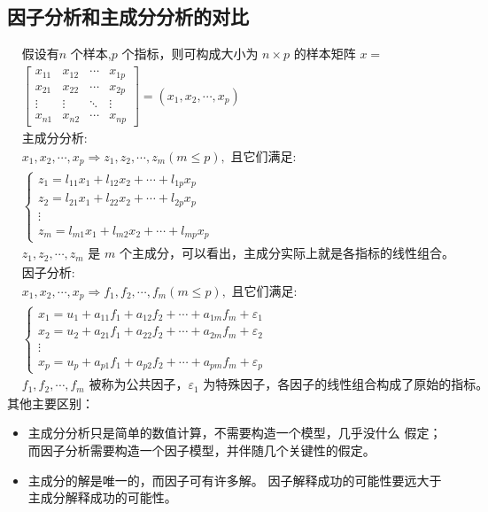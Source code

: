 \documentclass[12pt]{ctexart}
\numberwithin{equation}{section} %
\begin{document}
\subsection{因子分析和主成分分析的对比}
\begin{equation*}
  \begin{aligned}
  &\text{假设有} n \text{ 个样本,} p \text{ 个指标，则可构成大小为 } n \times p \text{ 的样本矩阵 } x = \\
  &\begin{bmatrix}
  x_{11} & x_{12} & \cdots & x_{1p} \\
  x_{21} & x_{22} & \cdots & x_{2p} \\
  \vdots & \vdots & \ddots & \vdots \\
  x_{n1} & x_{n2} & \cdots & x_{np}
  \end{bmatrix}
  = (x_1, x_2, \cdots, x_p) \\
  &\text{主成分分析:} \\
  &x_1, x_2, \cdots, x_p \Rightarrow z_1, z_2, \cdots, z_m (m \leq p), \text{ 且它们满足:} \\
  &\left\{
  \begin{array}{l}
  z_1 = l_{11}x_1 + l_{12}x_2 + \cdots + l_{1p}x_p \\
  z_2 = l_{21}x_1 + l_{22}x_2 + \cdots + l_{2p}x_p \\
  \vdots \\
  z_m = l_{m1}x_1 + l_{m2}x_2 + \cdots + l_{mp}x_p
  \end{array}
  \right. \\
  &z_1, z_2, \cdots, z_m \text{ 是 } m \text{ 个主成分，可以看出，主成分实际上就是各指标的线性组合。} \\
  &\text{因子分析:} \\
  &x_1, x_2, \cdots, x_p \Rightarrow f_1, f_2, \cdots, f_m (m \leq p), \text{ 且它们满足:} \\
  &\left\{
  \begin{array}{l}
  x_1 = u_1 + a_{11}f_1 + a_{12}f_2 + \cdots + a_{1m}f_m + \varepsilon_1 \\
  x_2 = u_2 + a_{21}f_1 + a_{22}f_2 + \cdots + a_{2m}f_m + \varepsilon_2 \\
  \vdots \\
  x_p = u_p + a_{p1}f_1 + a_{p2}f_2 + \cdots + a_{pm}f_m + \varepsilon_p
  \end{array}
  \right. \\
  &f_1, f_2, \cdots, f_m \text{ 被称为公共因子，} \varepsilon_1 \text{ 为特殊因子，各因子的线性组合构成了原始的指标。}
  \end{aligned}
\end{equation*}
其他主要区别：
\begin{itemize}
  \item 主成分分析只是简单的数值计算，不需要构造一个模型，几乎没什么
假定；而因子分析需要构造一个因子模型，并伴随几个关键性的假定。
\item 主成分的解是唯一的，而因子可有许多解。
因子解释成功的可能性要远大于主成分解释成功的可能性。
\end{itemize}
\end{document}
